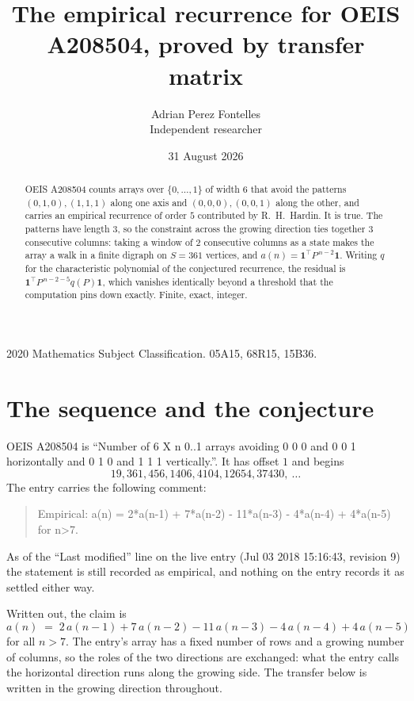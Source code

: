\documentclass[11pt,a4paper]{article}
\title{The empirical recurrence for OEIS A208504, proved by transfer matrix}
\author{Adrian Perez Fontelles\\ \small Independent researcher}
\date{31 August 2026}
\theoremstyle{plain}
\theoremstyle{definition}
\begin{document}
\maketitle

\begin{abstract}
OEIS A208504 counts arrays over $\{0,\dots,1\}$ of width $6$ that avoid the patterns
$(0,1,0), (1,1,1)$ along one axis and $(0,0,0), (0,0,1)$ along the other, and carries an empirical recurrence of
order $5$ contributed by R.~H.~Hardin. It is true. The patterns have length $3$, so
the constraint across the growing direction ties together $3$ consecutive columns: taking a
window of $2$ consecutive columns as a state makes the array a walk in a finite digraph
on $S=361$ vertices, and $a(n)=\mathbf{1}^{\!\top}P^{\,n-2}\mathbf{1}$. Writing $q$
for the characteristic polynomial of the conjectured recurrence, the residual is
$\mathbf{1}^{\!\top}P^{\,n-2-5}q(P)\mathbf{1}$, which vanishes identically
beyond a threshold that the computation pins down exactly. Finite, exact, integer.
\end{abstract}

\noindent\small 2020 Mathematics Subject Classification. 05A15, 68R15, 15B36.\normalsize

\section{The sequence and the conjecture}

OEIS A208504 is ``Number of 6 X n 0..1 arrays avoiding 0 0 0 and 0 0 1 horizontally and 0 1 0 and 1 1 1 vertically.''. It has offset
$1$ and begins
\[
19, 361, 456, 1406, 4104, 12654, 37430,\ \dots
\]
The entry carries the following comment:
\begin{quote}\small
Empirical: a(n) = 2*a(n-1) + 7*a(n-2) - 11*a(n-3) - 4*a(n-4) + 4*a(n-5) for n>7.
\end{quote}
As of the ``Last modified'' line on the live entry (Jul 03 2018 15:16:43, revision
9) the statement is still recorded as empirical, and nothing on the entry
records it as settled either way.

Written out, the claim is
\begin{equation}\label{eq:conj}
a(n)\;=\;2\,a(n-1) + 7\,a(n-2) - 11\,a(n-3) - 4\,a(n-4) + 4\,a(n-5)
\end{equation}
for all $n>7$. The entry's array has a fixed number of rows and a growing number of
columns, so the roles of the two directions are exchanged: what the entry calls the
horizontal direction runs along the growing side. The transfer below is written in the
growing direction throughout.
\end{document}
